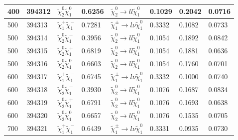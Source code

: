 \begin{table}[htb]
{{\begin{tabular}{llllllll}
                400             & 394312 & $\widetilde{\chi}^{0}_{2}\widetilde{\chi}^{0}_{1}$ & 0.6256              & $\widetilde{\chi}^{0}_{2} \rightarrow l l \widetilde{\chi}^{0}_{1}$     &  0.1029      &  0.2042           &  0.0716\\
                \hline
                500             & 394313 & $\widetilde{\chi}^{+}_{1}\widetilde{\chi}^{-}_{1}$ & 0.7281              & $\widetilde{\chi}^{\pm}_{1} \rightarrow l \nu \widetilde{\chi}^{0}_{1}$ &  0.3332      &  0.1082           &  0.0733\\
                500             & 394314 & $\widetilde{\chi}^{0}_{2}\widetilde{\chi}^{-}_{1}$ & 0.3956              & $\widetilde{\chi}^{0}_{2} \rightarrow l l \widetilde{\chi}^{0}_{1}$     &  0.1054      &  0.1892           &  0.0842\\
                500             & 394315 & $\widetilde{\chi}^{0}_{2}\widetilde{\chi}^{+}_{1}$ & 0.6819              & $\widetilde{\chi}^{0}_{2} \rightarrow l l \widetilde{\chi}^{0}_{1}$     &  0.1054      &  0.1881           &  0.0636\\
                500             & 394316 & $\widetilde{\chi}^{0}_{2}\widetilde{\chi}^{0}_{1}$ & 0.6603              & $\widetilde{\chi}^{0}_{2} \rightarrow l l \widetilde{\chi}^{0}_{1}$     &  0.1054      &  0.1760           &  0.0701\\
                \hline
                600             & 394317 & $\widetilde{\chi}^{+}_{1}\widetilde{\chi}^{-}_{1}$ & 0.6745              & $\widetilde{\chi}^{\pm}_{1} \rightarrow l \nu \widetilde{\chi}^{0}_{1}$ &  0.3332      &  0.1000           &  0.0740\\
                600             & 394318 & $\widetilde{\chi}^{0}_{2}\widetilde{\chi}^{-}_{1}$ & 0.3930              & $\widetilde{\chi}^{0}_{2} \rightarrow l l \widetilde{\chi}^{0}_{1}$     &  0.1076      &  0.1687           &  0.0834\\
                600             & 394319 & $\widetilde{\chi}^{0}_{2}\widetilde{\chi}^{+}_{1}$ & 0.6791              & $\widetilde{\chi}^{0}_{2} \rightarrow l l \widetilde{\chi}^{0}_{1}$     &  0.1076      &  0.1693           &  0.0638\\
                600             & 394320 & $\widetilde{\chi}^{0}_{2}\widetilde{\chi}^{0}_{1}$ & 0.6657              & $\widetilde{\chi}^{0}_{2} \rightarrow l l \widetilde{\chi}^{0}_{1}$     &  0.1076      &  0.1535           &  0.0705\\
                \hline
                700             & 394321 & $\widetilde{\chi}^{+}_{1}\widetilde{\chi}^{-}_{1}$ & 0.6439              & $\widetilde{\chi}^{\pm}_{1} \rightarrow l \nu \widetilde{\chi}^{0}_{1}$ &  0.3331      &  0.0935           &  0.0730\\

\end{tabular}}}
\end{table}
